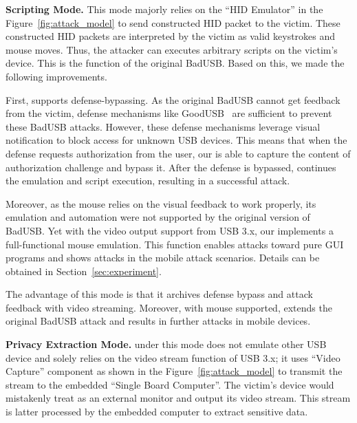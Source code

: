 \textbf{Scripting Mode.} This mode majorly relies on the ``HID Emulator'' in the Figure~\ref{fig:attack_model} to
send constructed HID packet to the victim. These constructed HID packets are
interpreted by the victim as valid keystrokes and mouse moves. Thus, the
attacker can executes arbitrary scripts on the victim's device. This is the
function of the original BadUSB. Based on this, we made the following
improvements.

First, \tool supports defense-bypassing. As the original BadUSB cannot get
feedback from the victim, defense mechanisms like GoodUSB~\cite{tian2015defending} are sufficient to prevent these BadUSB attacks.
However, these defense mechanisms leverage visual notification to block access
for unknown USB devices. This means that when the defense requests authorization
from the user, our \tool is able to capture the content of authorization
challenge and bypass it. After the defense is bypassed, \tool continues the
emulation and script execution, resulting in a successful attack.

Moreover, as the mouse relies on the visual feedback to work properly, its
emulation and automation were not supported by the original version of BadUSB.
Yet with the video output support from USB 3.x, our \tool implements a
full-functional mouse emulation. This function enables attacks toward pure GUI
programs and shows attacks in the mobile attack scenarios. Details can
be obtained in Section~\ref{sec:experiment}.

The advantage of this mode is that it archives defense bypass and attack
feedback with video streaming.  
Moreover, with mouse
supported, \tool extends the original BadUSB attack and results in further attacks in
mobile devices.

\textbf{Privacy Extraction Mode.} \tool under this mode does not emulate other
USB device and solely relies on the video stream function of USB 3.x; it uses
``Video Capture'' component as shown in the Figure~\ref{fig:attack_model} to transmit the stream to the embedded ``Single Board Computer''.
The victim's device would mistakenly treat \tool as an external monitor
and output its video stream. This stream is latter processed by the embedded
computer to extract sensitive data.

